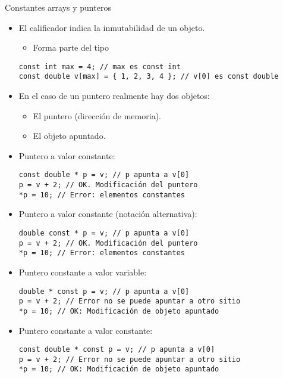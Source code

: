 \begin{frame}[fragile]{Constantes arrays y punteros}
\begin{itemize}
  \item El calificador  indica la inmutabilidad de un objeto.
    \begin{itemize}
      \item Forma parte del tipo
    \end{itemize}
\begin{lstlisting}
const int max = 4; // max es const int
const double v[max] = { 1, 2, 3, 4 }; // v[0] es const double
\end{lstlisting}
  \item En el caso de un puntero realmente hay dos objetos:
    \begin{itemize}
      \item El puntero (dirección de memoria).
      \item El objeto apuntado.
    \end{itemize}
\end{itemize}
\end{frame}

\begin{frame}[fragile]
\begin{itemize}
  \item Puntero a valor constante:
\begin{lstlisting}
const double * p = v; // p apunta a v[0]
p = v + 2; // OK. Modificación del puntero
*p = 10; // Error: elementos constantes
\end{lstlisting}
  \item Puntero a valor constante (notación alternativa):
\begin{lstlisting}
double const * p = v; // p apunta a v[0]
p = v + 2; // OK. Modificación del puntero
*p = 10; // Error: elementos constantes
\end{lstlisting}
  \item Puntero constante a valor variable:
\begin{lstlisting}
double * const p = v; // p apunta a v[0]
p = v + 2; // Error no se puede apuntar a otro sitio
*p = 10; // OK: Modificación de objeto apuntado
\end{lstlisting}
  \item Puntero constante a valor constante:
\begin{lstlisting}
const double * const p = v; // p apunta a v[0]
p = v + 2; // Error no se puede apuntar a otro sitio
*p = 10; // OK: Modificación de objeto apuntado
\end{lstlisting}
\end{itemize}
\end{frame}

